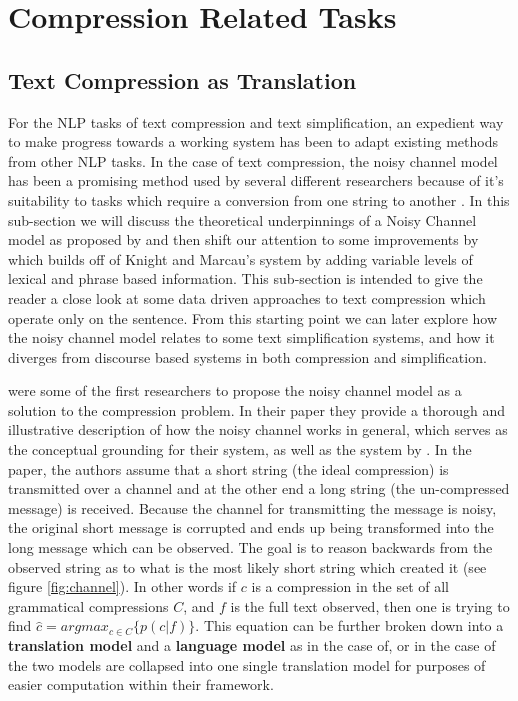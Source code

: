 \section{Compression Related Tasks}


\subsection{Text Compression as Translation}


{For the NLP tasks of text compression and text simplification, an expedient way to make progress towards a working system has been to adapt existing methods from other NLP tasks.  In the case of text compression, the noisy channel model has been a promising method used by several different researchers because of it's suitability to tasks which require a conversion from one string to another \citep{knight2000statistics,galley2007lexicalized}. In this sub-section we will discuss the theoretical underpinnings of a Noisy Channel model as proposed by \citet{knight2000statistics} and then shift our attention to some improvements by \citet{galley2007lexicalized} which builds off of Knight and Marcau's system by adding variable levels of lexical and phrase based information. This sub-section is intended to give the reader a close look at some data driven approaches to text compression which operate only on the sentence. From this starting point we can later explore how the noisy channel model relates to some text simplification systems, and how it diverges from discourse based systems in both compression and simplification.}

{\citet{knight2000statistics} were some of the first researchers to propose the noisy channel model as a solution to the compression problem.  In their paper they provide a thorough and illustrative description of how the noisy channel works in general, which serves as the conceptual grounding for their system, as well as the system by \citet{galley2007lexicalized}.  In the paper, the authors assume that a short string (the ideal compression) is transmitted over a channel and at the other end a long string (the un-compressed message) is received.  Because the channel for transmitting the message is noisy, the original short message is corrupted and ends up being transformed into the long message which can be observed. The goal is to reason backwards from the observed string as to what is the most likely short string which created it (see figure \ref{fig:channel}).  In other words if $ c $ is a compression in the set of all grammatical compressions $C$, and $ f $ is the full text observed, then one is trying to find $ \hat{c} = argmax_{c\in C} \{ p(c|f)\} $.  This equation can be further broken down into a \textbf{translation model} and a \textbf{language model} as in the case of\citet{knight2000statistics}, or in the case of \citet{galley2007lexicalized} the two models are collapsed into one single translation model for purposes of easier computation within their framework.}

